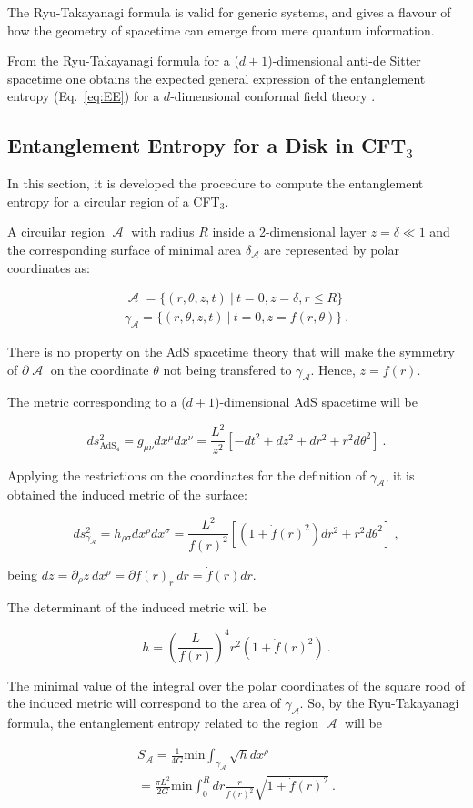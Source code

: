 \documentclass[twocolumn]{revtex4}
\providecommand{\eq}[2]{
    \begin{equation}
        #2
    \label{eq:#1}
    \end{equation}
}
\providecommand{\eqgat}[2]{
    \begin{gather}
        #2
    \label{eq:#1}
    \end{gather}
}
\DeclareMathOperator{\calA}{\mathcal{A}}
\begin{document}
The Ryu-Takayanagi formula is valid for generic systems, and gives a flavour of how the geometry of spacetime can emerge from mere quantum information. 

From the Ryu-Takayanagi formula for a ($d+1$)-dimensional anti-de Sitter spacetime one obtains the expected general expression of the entanglement entropy (Eq.~\ref{eq:EE}) for a $d$-dimensional conformal field theory \cite{}.


\subsection{Entanglement Entropy for a Disk in CFT$_3$} \label{ss:EE-disk}

In this section, it is developed the procedure to compute the entanglement entropy for a circular region of a CFT$_3$.

A circuilar region $\calA$ with radius $R$ inside a 2-dimensional layer $z = \delta \ll 1$ and the corresponding surface of minimal area $\delta_{\calA}$ are represented by polar coordinates as:
\eqgat{1A}{
    \calA = \{ ( r, \theta, z, t ) \ | \ t = 0, z = \delta, r \le R \} \nonumber \\
    \gamma_{\calA} = \{ ( r, \theta, z, t ) \ | \ t = 0, z = f (r, \theta) \} \ .
}
There is no property on the AdS spacetime theory that will make the symmetry of $\partial \calA$ on the coordinate $\theta$ not being transfered to $\gamma_{\calA}$. Hence, $z = f (r)$.

The metric corresponding to a ($d+1$)-dimensional AdS spacetime will be
\eq{1Ametric}{
    ds^2_{\text{AdS}_4} = g_{\mu \nu} dx^\mu dx^\nu = 
    \frac{L^2}{z^2} [ -dt^2 + dz^2 + dr^2 + r^2 d\theta^2 ] \ .
}

Applying the restrictions on the coordinates for the definition of $\gamma_{\calA}$, it is obtained the induced metric of the surface:
\eq{1gammaAmetric}{
    ds^2_{\gamma_{\calA}} = h_{\rho \sigma} dx^\rho dx^\sigma = 
    \frac{L^2}{f(r)^2} \left[ \left( 1+ \dot{f}(r)^2 \right) dr^2 + r^2 d\theta^2 \right] \ ,
}
being $dz = \partial_\rho z \ dx^\rho = \partial f(r)_r \ dr = \dot{f}(r) dr$.

The determinant of the induced metric will be
\eq{1h}{
    h = \left( \frac{L}{f(r)} \right) ^4 r^2 ( 1 + \dot{f}(r)^2 ) \ .
}

The minimal value of the integral over the polar coordinates of the square rood of the induced metric will correspond to the area of $\gamma_{\calA}$. So, by the Ryu-Takayanagi formula, the entanglement entropy related to the region $\calA$ will be
\eqgat{1EEA}{
    S_{\calA} = \frac{1}{4G} \text{min} \int_{\gamma_{\calA}} \sqrt{h} dx^\rho \nonumber \\
    = \frac{\pi L^2}{2G} \text{min} \int_0^R dr \frac{r}{f(r)^2} \sqrt{ 1 + \dot{f}(r)^2 } \ .
}
\end{document}
